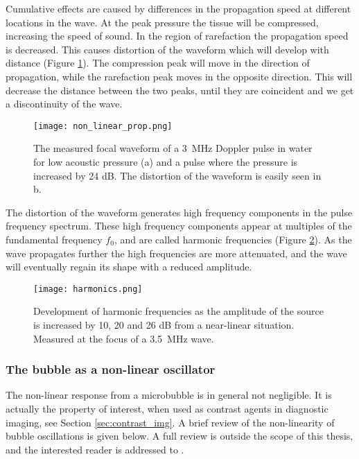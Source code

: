 Cumulative effects are caused by differences in the propagation speed at different locations in the wave. At the peak pressure the tissue will be compressed, increasing the speed of sound. In the region of rarefaction the propagation speed is decreased.  This causes distortion of the waveform which will develop with distance (Figure \ref{Fig:non_lin_prop}). The compression peak will move in the direction of propagation, while the rarefaction peak moves in the opposite direction. This will decrease the distance between the two peaks, until they are coincident and we get a discontinuity of the wave.  

\begin{figure}[h]
  \centering
  \texttt{[image: non\_linear\_prop.png]}
  \caption{The measured focal waveform of a \SI{3}{\mega\hertz} Doppler pulse in water for low acoustic pressure (a) and a pulse where the pressure is increased by 24 dB. The distortion of the waveform is easily seen in b\cite{Uck2002}.}
  \label{Fig:non_lin_prop}
\end{figure} 

The distortion of the waveform generates high frequency components in the pulse frequency spectrum. These high frequency components appear at multiples of the fundamental frequency $f_0$, and are called harmonic frequencies (Figure \ref{Fig:harmonics}). As the wave propagates further the high frequencies are more attenuated, and the wave will eventually regain its shape with a reduced amplitude. 

\begin{figure}[h]
  \centering
  \texttt{[image: harmonics.png]}
  \caption{Development of harmonic frequencies as the amplitude of the source is increased by 10, 20 and 26 dB from a near-linear situation. Measured at the focus of a \SI{3.5}{\mega\hertz} wave\cite{Uck2002}.}
  \label{Fig:harmonics}
\end{figure} 



\subsubsection{The bubble as a non-linear oscillator}
The non-linear response from a microbubble is in general not negligible. It is actually the property of interest, when used as contrast agents in diagnostic imaging, see Section \ref{sec:contrast_img}. A brief review of the non-linearity of bubble oscillations is given below. A full review is outside the scope of this thesis, and the interested reader is addressed to \citet{Hoff2000}. 

